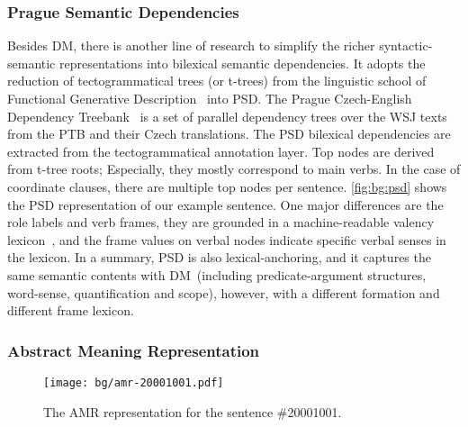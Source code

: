 \subsubsection{Prague Semantic Dependencies}
\label{sssec:bg:psd}
Besides DM, there is another line of research to simplify the richer
syntactic-semantic representations into bilexical semantic
dependencies. It adopts the reduction of tectogrammatical trees (or
t-trees) from the linguistic school of Functional Generative
Description~\citep[FGD,][]{Sga:Haj:Pan:86,hajic2012announcing} into
PSD. The Prague Czech-English Dependency
Treebank~\citep[PCEDT,][]{hajic2012announcing} is a set of parallel
dependency trees over the WSJ texts from the PTB and their Czech
translations. The PSD bilexical dependencies are extracted from the
tectogrammatical annotation layer. Top nodes are derived from t-tree
roots; Especially, they mostly correspond to main verbs. In the case
of coordinate clauses, there are multiple top nodes per
sentence. \autoref{fig:bg:psd} shows the PSD representation of our
example sentence. One major differences are the role labels and verb
frames, they are grounded in a machine-readable valency
lexicon~\citep{urevsova2016czengvallex}, and the frame values on
verbal nodes indicate specific verbal senses in the
lexicon. In a summary, PSD is also lexical-anchoring, and it
  captures the same semantic contents with DM~(including
  predicate-argument structures, word-sense, quantification and
  scope), however, with a different formation and different frame
  lexicon.



\subsubsection{Abstract Meaning Representation}
\label{ssec:bg:amr}
%
\begin{figure}[!tbp]
\centering
\texttt{[image: bg/amr-20001001.pdf]}
\caption{\label{fig:bg:amr} The AMR representation for the sentence
  \#20001001.}
\end{figure}

